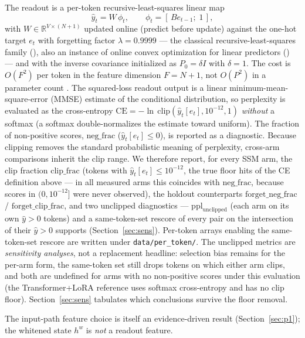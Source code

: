 \documentclass[preprint,12pt]{elsarticle}
\begin{document}
The readout is a per-token recursive-least-squares linear map
\begin{equation}
\hat{y}_t = W\, \phi_t, \qquad \phi_t = [\,B e_{t-1};\; 1\,],
\label{eq:readout}
\end{equation}
with $W \in \mathbb{R}^{V \times (N+1)}$ updated online (predict
before update) against the one-hot target $e_t$ with forgetting factor
$\lambda = 0.9999$ --- the classical recursive-least-squares family
(\cite{ljung1983,haykin2002,goodwin1984}), also an instance of online
convex optimization for linear predictors
(\cite{zinkevich2003,cesabianchi2006}) --- and with the inverse
covariance initialized as $P_0 = \delta I$ with $\delta = 1$. The cost
is $O(F^2)$ per token in the feature
dimension $F = N+1$, not $O(P^2)$ in a parameter count
\cite{redemb,redemc}. The squared-loss readout output is a linear
minimum-mean-square-error (MMSE)
estimate of the conditional distribution, so perplexity is evaluated as
the cross-entropy
$\mathrm{CE} = -\ln\,\mathrm{clip}(\hat{y}_t[e_t], 10^{-12}, 1)$
\emph{without} a softmax (a softmax double-normalizes the estimate
toward uniform).
The fraction of non-positive scores, $\mathrm{neg\_frac}$
($\hat y_t[e_t]\le 0$), is reported as a diagnostic. Because clipping
removes the standard probabilistic
meaning of perplexity, cross-arm comparisons inherit the clip range.
We therefore report, for every SSM arm, the clip fraction
$\mathrm{clip\_frac}$ (tokens with $\hat y_t[e_t]\le10^{-12}$, the
true floor hits of the CE definition above --- in all measured arms this
coincides with $\mathrm{neg\_frac}$, because scores in
$(0,10^{-12}]$ were never observed),
the holdout counterparts $\mathrm{forget\_neg\_frac}$ /
$\mathrm{forget\_clip\_frac}$, and two unclipped diagnostics ---
$\mathrm{ppl}_{\mathrm{unclipped}}$ (each arm on its own
$\hat y>0$ tokens) and a same-token-set rescore of every pair on the
intersection of their $\hat y>0$ supports (Section~\ref{sec:sens}).
Per-token arrays enabling the same-token-set rescore are written under
\texttt{data/per\_token/}. The
unclipped metrics are \emph{sensitivity analyses}, not a replacement
headline: selection bias remains for the per-arm form, the same-token
set still drops tokens on which either arm clips, and both are
undefined for arms with no
non-positive scores under this evaluation (the Transformer+LoRA
reference uses softmax cross-entropy and has no clip floor).
Section~\ref{sec:sens} tabulates which conclusions survive the floor
removal.

The input-path feature choice is itself an evidence-driven result
(Section~\ref{sec:p1}); the whitened state $h^w$ is \emph{not} a readout
feature.
\end{document}
